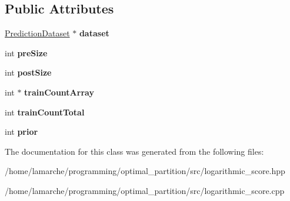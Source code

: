 \subsection*{Public Attributes}
\begin{DoxyCompactItemize}
\item 
\hypertarget{classLogarithmicScore_afc0e37fc64d6dc1742120ea6b940fd0f}{\hyperlink{classPredictionDataset}{Prediction\-Dataset} $\ast$ {\bfseries dataset}}\label{classLogarithmicScore_afc0e37fc64d6dc1742120ea6b940fd0f}

\item 
\hypertarget{classLogarithmicScore_ab6a0f495948bbb7d877064baef838993}{int {\bfseries pre\-Size}}\label{classLogarithmicScore_ab6a0f495948bbb7d877064baef838993}

\item 
\hypertarget{classLogarithmicScore_addfd4b0d086013c199a424628450f64b}{int {\bfseries post\-Size}}\label{classLogarithmicScore_addfd4b0d086013c199a424628450f64b}

\item 
\hypertarget{classLogarithmicScore_a801f0da7f5ba568bf727387144cac392}{int $\ast$ {\bfseries train\-Count\-Array}}\label{classLogarithmicScore_a801f0da7f5ba568bf727387144cac392}

\item 
\hypertarget{classLogarithmicScore_ace0a8c93c27c83a3f209b1faf7fdb24e}{int {\bfseries train\-Count\-Total}}\label{classLogarithmicScore_ace0a8c93c27c83a3f209b1faf7fdb24e}

\item 
\hypertarget{classLogarithmicScore_a0a221889c0e7f4c3a1ba3fd80b1f3603}{int {\bfseries prior}}\label{classLogarithmicScore_a0a221889c0e7f4c3a1ba3fd80b1f3603}

\end{DoxyCompactItemize}


The documentation for this class was generated from the following files\-:\begin{DoxyCompactItemize}
\item 
/home/lamarche/programming/optimal\-\_\-partition/src/logarithmic\-\_\-score.\-hpp\item 
/home/lamarche/programming/optimal\-\_\-partition/src/logarithmic\-\_\-score.\-cpp\end{DoxyCompactItemize}
